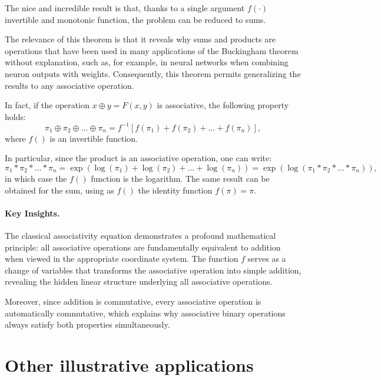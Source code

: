 The nice and incredible result is that, thanks to a single argument $f(\cdot)$ invertible and monotonic function, the problem can be reduced to sums.

The relevance of this theorem is that it reveals why sums and products are operations that have been used in many applications of the Buckingham theorem without explanation, such as, for example, in neural networks when combining neuron outputs with weights. Consequently, this theorem permits generalizing the results to any associative operation.

In fact, if the operation $x \oplus y=F(x,y)$ is associative, the following property holds:
\begin{equation}
\pi_1\oplus \pi_2 \oplus \ldots \oplus \pi_n = f^{-1}[f(\pi_1)+f(\pi_2)+\ldots+f(\pi_n)],
\label{eq:associativeproperty}
\end{equation}
where $f()$ is an invertible function.

In particular, since the product is an associative operation, one can write:
\begin{equation}
\pi_1 * \pi_2 * \ldots * \pi_n = \exp(\log(\pi_1)+\log(\pi_2)+\ldots+\log(\pi_n)) = \exp(\log(\pi_1 *\pi_2 * \ldots * \pi_n)),
\label{eq:productexample}
\end{equation}
in which case the $f()$ function is the logarithm. The same result can be obtained for the sum, using as $f()$ the identity function $f(\pi)=\pi$.

\paragraph{Key Insights.}
The classical associativity equation demonstrates a profound mathematical principle: all associative operations are fundamentally equivalent to addition when viewed in the appropriate coordinate system. The function $f$ serves as a change of variables that transforms the associative operation into simple addition, revealing the hidden linear structure underlying all associative operations.

Moreover, since addition is commutative, every associative operation is automatically commutative, which explains why associative binary operations always satisfy both properties simultaneously.


\section{Other illustrative applications}

